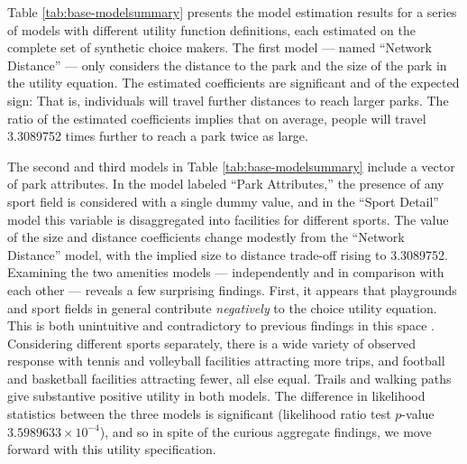 \documentclass[3p, authoryear]{elsarticle} %
\begin{document}
Table \ref{tab:base-modelsummary} presents the model estimation results for a
series of models with different utility function definitions, each estimated on the
complete set of synthetic choice makers. The first model --- named ``Network
Distance'' --- only considers the distance to the park and the size of the park
in the utility equation. The estimated coefficients are significant and of the
expected sign: That is, individuals will travel further distances to reach larger
parks. The ratio of the estimated coefficients implies that on average, people
will travel 3.3089752 times further to reach a park twice as large.

The second and third models in Table \ref{tab:base-modelsummary} include a
vector of park attributes. In the model labeled ``Park Attributes,'' the presence
of any sport field is considered with a single dummy value, and in the ``Sport
Detail'' model this variable is disaggregated into facilities for different
sports. The value of the size and distance coefficients change modestly from
the ``Network Distance'' model, with the implied size to distance trade-off rising
to 3.3089752. Examining the two amenities models --- independently and in
comparison with each other --- reveals a few surprising findings. First, it
appears that playgrounds and sport fields in general contribute \emph{negatively} to
the choice utility equation. This is both unintuitive and contradictory to
previous findings in this space \citep[e.g.,][]{Kinnell2006}. Considering different
sports separately, there is a wide variety of observed response with tennis and
volleyball facilities attracting more trips, and football and basketball
facilities attracting fewer, all else equal. Trails and walking paths give
substantive positive utility in both models. The difference in likelihood statistics
between the three models is significant (likelihood ratio test
\(p\)-value \ensuremath{3.5989633\times 10^{-4}}), and so in spite of the curious aggregate findings,
we move forward with this utility specification.
\end{document}
